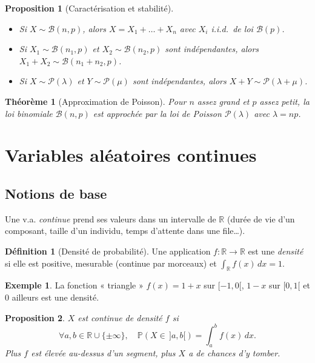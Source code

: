 \documentclass[11pt,a4paper]{article}
\renewcommand{\P}{\mathbb{P}}
\newcommand{\R}{\mathbb{R}}
\newcommand{\1}{\mathbf{1}}
\theoremstyle{definition}
\newtheorem*{definition}{Définition}
\newtheorem*{exemple}{Exemple}
\theoremstyle{plain}
\newtheorem*{proposition}{Proposition}
\newtheorem*{theoreme}{Théorème}
\theoremstyle{remark}
\begin{document}
\begin{proposition}[Caractérisation et stabilité]
\begin{itemize}
  \item Si $X\sim\mathcal{B}(n,p)$, alors $X=X_1+\dots+X_n$ avec $X_i$ i.i.d.\ de loi $\mathcal{B}(p)$.
  \item Si $X_1\sim\mathcal{B}(n_1,p)$ et $X_2\sim\mathcal{B}(n_2,p)$ sont indépendantes, alors $X_1+X_2\sim\mathcal{B}(n_1+n_2,p)$.
  \item Si $X\sim\mathcal{P}(\lambda)$ et $Y\sim\mathcal{P}(\mu)$ sont indépendantes, alors $X+Y\sim\mathcal{P}(\lambda+\mu)$.
\end{itemize}
\end{proposition}

\begin{theoreme}[Approximation de Poisson]
Pour $n$ assez grand et $p$ assez petit, la loi binomiale $\mathcal{B}(n,p)$ est approchée par la loi de Poisson $\mathcal{P}(\lambda)$ avec $\lambda=np$.
\end{theoreme}

\section{Variables aléatoires continues}

\subsection{Notions de base}

Une v.a. \emph{continue} prend ses valeurs dans un intervalle de $\R$ (durée de vie d'un composant, taille d'un individu, temps d'attente dans une file\dots).

\begin{definition}[Densité de probabilité]
Une application $f:\R\to\R$ est une \emph{densité} si elle est positive, mesurable (continue par morceaux) et $\displaystyle\int_{\R}f(x)\,dx=1$.
\end{definition}

\begin{exemple}
La fonction « triangle » $f(x)=1+x$ sur $[-1,0[$, $1-x$ sur $[0,1[$ et $0$ ailleurs est une densité.
\end{exemple}

\begin{proposition}
$X$ est continue de densité $f$ si
\[
\forall a,b\in\R\cup\{\pm\infty\},\quad \P(X\in\,]a,b[)=\int_a^b f(x)\,dx.
\]
Plus $f$ est élevée au-dessus d'un segment, plus $X$ a de chances d'y tomber.
\end{proposition}
\end{document}
